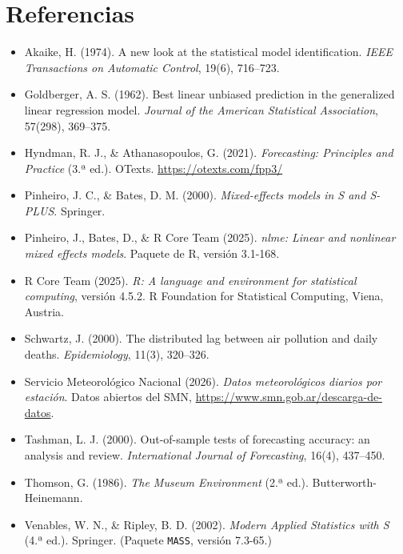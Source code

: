 \documentclass[11pt,a4paper]{article}
\begin{document}
\section{Referencias}
\begin{itemize}
    \item Akaike, H. (1974). A new look at the statistical model identification. \textit{IEEE Transactions on Automatic Control}, 19(6), 716--723.
    \item Goldberger, A. S. (1962). Best linear unbiased prediction in the generalized linear regression model. \textit{Journal of the American Statistical Association}, 57(298), 369--375.
    \item Hyndman, R. J., \& Athanasopoulos, G. (2021). \textit{Forecasting: Principles and Practice} (3.ª ed.). OTexts. \url{https://otexts.com/fpp3/}
    \item Pinheiro, J. C., \& Bates, D. M. (2000). \textit{Mixed-effects models in S and S-PLUS}. Springer.
    \item Pinheiro, J., Bates, D., \& R Core Team (2025). \textit{nlme: Linear and nonlinear mixed effects models}. Paquete de R, versión 3.1-168.
    \item R Core Team (2025). \textit{R: A language and environment for statistical computing}, versión 4.5.2. R Foundation for Statistical Computing, Viena, Austria.
    \item Schwartz, J. (2000). The distributed lag between air pollution and daily deaths. \textit{Epidemiology}, 11(3), 320--326.
    \item Servicio Meteorológico Nacional (2026). \textit{Datos meteorológicos diarios por estación}. Datos abiertos del SMN, \url{https://www.smn.gob.ar/descarga-de-datos}.
    \item Tashman, L. J. (2000). Out-of-sample tests of forecasting accuracy: an analysis and review. \textit{International Journal of Forecasting}, 16(4), 437--450.
    \item Thomson, G. (1986). \textit{The Museum Environment} (2.ª ed.). Butterworth-Heinemann.
    \item Venables, W. N., \& Ripley, B. D. (2002). \textit{Modern Applied Statistics with S} (4.ª ed.). Springer. (Paquete \texttt{MASS}, versión 7.3-65.)
\end{itemize}

\clearpage
\appendix
\end{document}
